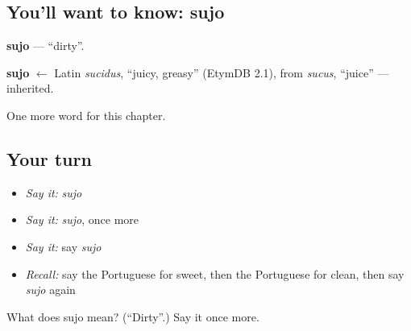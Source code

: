 \subsection*{You'll want to know: sujo}
\textbf{sujo} — \textquotedblleft{}dirty\textquotedblright{}.

\begin{cousinweb}
\textbf{sujo} $\leftarrow$ Latin \emph{sucidus}, \textquotedblleft{}juicy, greasy\textquotedblright{} (EtymDB 2.1), from \emph{sucus}, \textquotedblleft{}juice\textquotedblright{} — inherited.
\end{cousinweb}

\begin{grammarlens}[title={What you've built}]
One more word for this chapter.
\end{grammarlens}

\subsection*{Your turn}
\begin{itemize}
\raggedright
  \item \emph{Say it:} \emph{sujo}
  \item \emph{Say it:} \emph{sujo}, once more
  \item \emph{Say it:} say \emph{sujo}
  \item \emph{Recall:} say the Portuguese for sweet, then the Portuguese for clean, then say \emph{sujo} again
\end{itemize}

\begin{tcolorbox}[breakable,colback=teal!4,colframe=teal!35!black,title={Before you move on}]
What does sujo mean? (\textquotedblleft{}Dirty\textquotedblright{}.) Say it once more.
\end{tcolorbox}
